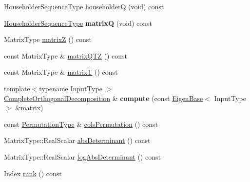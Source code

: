 \begin{DoxyCompactItemize}
\item 
\mbox{\hyperlink{class_eigen_1_1_householder_sequence}{Householder\+Sequence\+Type}} \mbox{\hyperlink{class_eigen_1_1_complete_orthogonal_decomposition_ac95b93ddad59c6e57d06fcd4737b27e1}{householderQ}} (void) const
\item 
\mbox{\label{class_eigen_1_1_complete_orthogonal_decomposition_a179e996df71ef165bad8f4bc5d79e24d}} 
\mbox{\hyperlink{class_eigen_1_1_householder_sequence}{Householder\+Sequence\+Type}} {\bfseries matrixQ} (void) const
\item 
Matrix\+Type \mbox{\hyperlink{class_eigen_1_1_complete_orthogonal_decomposition_a4cd178f13aefe5189d4beeb3eb1c5897}{matrixZ}} () const
\item 
const Matrix\+Type \& \mbox{\hyperlink{class_eigen_1_1_complete_orthogonal_decomposition_ad89e2529fc1a8721239d9b6be9613a69}{matrix\+Q\+TZ}} () const
\item 
const Matrix\+Type \& \mbox{\hyperlink{class_eigen_1_1_complete_orthogonal_decomposition_a806213f5c96ff765265f47067229586d}{matrixT}} () const
\item 
\mbox{\label{class_eigen_1_1_complete_orthogonal_decomposition_a28aa1e99ac0116246c66608f3fd10d31}} 
{\footnotesize template$<$typename Input\+Type $>$ }\\\mbox{\hyperlink{class_eigen_1_1_complete_orthogonal_decomposition}{Complete\+Orthogonal\+Decomposition}} \& {\bfseries compute} (const \mbox{\hyperlink{struct_eigen_1_1_eigen_base}{Eigen\+Base}}$<$ Input\+Type $>$ \&matrix)
\item 
const \mbox{\hyperlink{class_eigen_1_1_permutation_matrix}{Permutation\+Type}} \& \mbox{\hyperlink{class_eigen_1_1_complete_orthogonal_decomposition_a601c67a4a0bbe9c7b25b885279db9ff2}{cols\+Permutation}} () const
\item 
Matrix\+Type\+::\+Real\+Scalar \mbox{\hyperlink{class_eigen_1_1_complete_orthogonal_decomposition_ac040c34ce3fb2b68d3f57adc0c29d526}{abs\+Determinant}} () const
\item 
Matrix\+Type\+::\+Real\+Scalar \mbox{\hyperlink{class_eigen_1_1_complete_orthogonal_decomposition_ad59d6dc78dab52a0038ac372b4a72c0d}{log\+Abs\+Determinant}} () const
\item 
Index \mbox{\hyperlink{class_eigen_1_1_complete_orthogonal_decomposition_af348f64b26f8467a020062c22b748806}{rank}} () const

\end{DoxyCompactItemize}

